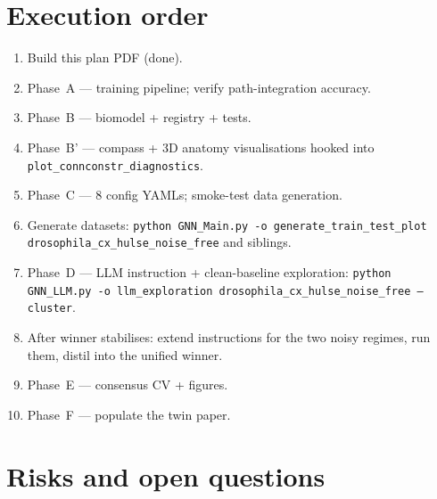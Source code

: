 \documentclass[11pt]{article}
\begin{document}
\section{Execution order}

\begin{enumerate}[leftmargin=*]
\item Build this plan PDF (done).
\item Phase~A --- training pipeline; verify path-integration accuracy.
\item Phase~B --- biomodel + registry + tests.
\item Phase~B' --- compass + 3D anatomy visualisations
  hooked into \texttt{plot\_connconstr\_diagnostics}.
\item Phase~C --- 8 config YAMLs; smoke-test data generation.
\item Generate datasets:
\texttt{python GNN\_Main.py -o generate\_train\_test\_plot drosophila\_cx\_hulse\_noise\_free}
and siblings.
\item Phase~D --- LLM instruction + clean-baseline exploration:
\texttt{python GNN\_LLM.py -o llm\_exploration drosophila\_cx\_hulse\_noise\_free --cluster}.
\item After winner stabilises: extend instructions for the two noisy
  regimes, run them, distil into the unified winner.
\item Phase~E --- consensus CV + figures.
\item Phase~F --- populate the twin paper.
\end{enumerate}

\section{Risks and open questions}
\end{document}
